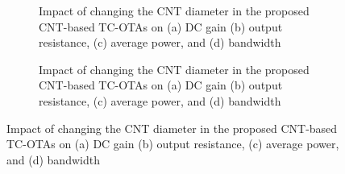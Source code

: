 
\begin{figure}[htbp]
  \centering
  \begin{subfigure}[b]{0.48\linewidth}
    \centering
    \caption{Impact of changing the CNT diameter in the proposed CNT-based TC-OTAs on (a) DC gain (b) output resistance, (c) average power, and (d) bandwidth}

  \end{subfigure}
  \hfill
  \begin{subfigure}[b]{0.48\linewidth}
    \centering
    \caption{Impact of changing the CNT diameter in the proposed CNT-based TC-OTAs on (a) DC gain (b) output resistance, (c) average power, and (d) bandwidth}

  \end{subfigure}
  \caption{Impact of changing the CNT diameter in the proposed CNT-based TC-OTAs on (a) DC gain (b) output resistance, (c) average power, and (d) bandwidth}

  \label{fig:group_wxw2q}
\end{figure}
